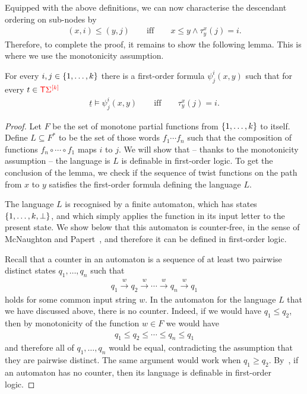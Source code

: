 Equipped with the above definitions, we can now characterise the descendant ordering on sub-nodes by
\begin{align*}
    (x,i) \le (y,j) \qquad \text{iff} \qquad x \le y \land \tau_y^x(j)=i.
\end{align*}
Therefore, to complete the proof, it remains to show the following lemma. This is where we use the monotonicity assumption.

\begin{lemma}\label{lem:counter-free}
    For every $i,j \in \{1,\ldots,k\}$ 
    there is a first-order formula $\psi_j^i(x,y)$ such that for every $t  \in {\color{red}{\mathsf T}} {\color{red}{\Sigma}}^{{\color{red}{[k]}}}$
    \begin{align*}
    \underline t \models \psi_j^i(x,y) \qquad \text{iff} \qquad \tau_y^x(j)=i.
    \end{align*}
\end{lemma}
\begin{proof}
    Let $F$ be the set of monotone partial functions  from $\{1,\ldots,k\}$ to itself. Define $L \subseteq F^*$ to be the set of those words $f_1 \cdots f_n$ such that the composition of functions $f_n\circ \cdots \circ f_1$ maps $i$ to $j$. We will show that -- thanks to the monotonicity assumption -- the language is $L$ is definable in first-order logic. To get the conclusion of the lemma, we check if the sequence of twist functions on the path  from $x$ to $y$ satisfies the first-order formula defining the language $L$.
    
    
    The language $L$ is recognised by a finite automaton, which has states $\{1,\ldots,k,\bot\}$, and which simply applies the function in its input letter to the present state. We show below that this automaton is counter-free, in the sense of McNaughton and Papert~\cite[p.~6]{McNaughtonPapert71}, and therefore it can be defined in first-order logic. 

    Recall that a counter in an automaton is a sequence of at least two pairwise distinct states $q_1,\ldots,q_n$ such that
    \begin{align*}
    q_1  \stackrel w \to q_2 \stackrel w \to \cdots \stackrel w \to q_n \stackrel w \to q_1
    \end{align*}
    holds for some common input string $w$. In the automaton for the language $L$ that we have discussed above, there is no counter. Indeed, if we would have $q_1 \le q_2$, then by monotonicity of the function   $w \in F$ we would have 
    \begin{align*}
    q_1 \le q_2 \le \cdots \le q_n \le q_1
    \end{align*}
    and therefore all of $q_1,\ldots,q_n$ would be equal, contradicting the assumption that they are pairwise distinct. The same argument would work when $q_1 \ge q_2$. By~\cite[Theorem 10.5]{McNaughtonPapert71}, if an automaton has no counter, then its language is definable in first-order logic. 
    
\end{proof}